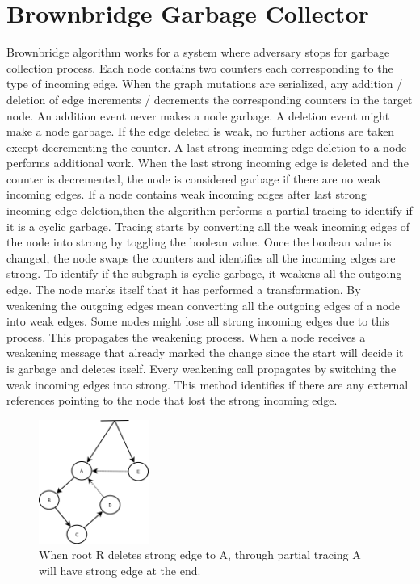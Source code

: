 \section{Brownbridge Garbage Collector}
Brownbridge algorithm works for a system where adversary stops for garbage collection process. Each node contains two counters each corresponding to the type of incoming edge. When the graph mutations are serialized, any addition / deletion of edge increments / decrements the corresponding counters in the target node. An addition event never makes a node garbage. A deletion event might make a node garbage. If the edge deleted is weak, no further actions are taken except decrementing the counter. A last strong incoming edge deletion to a node performs additional work. When the last strong incoming edge is deleted and the counter is decremented, the node is considered garbage if there are no weak incoming edges. If a node contains weak incoming edges after last strong incoming edge deletion,then the algorithm performs a partial tracing to identify if it is a cyclic garbage. Tracing starts by converting all the weak incoming edges of the node into strong by toggling the boolean value. Once the boolean value is changed, the node swaps the counters and identifies all the incoming edges are strong. To identify if the subgraph is cyclic garbage, it weakens all the outgoing edge. The node marks itself that it has performed a transformation. By weakening the outgoing edges mean converting all the outgoing edges of a node into weak edges. Some nodes might lose all strong incoming edges due to this process. This propagates the weakening process. When a node receives a weakening message that already marked the change since the start will decide it is garbage and deletes itself. Every weakening call propagates by switching the weak incoming edges into strong. This method identifies if there are any external references pointing to the node that lost the strong incoming edge. 

\begin{figure}[!t]
	\centering
	\includegraphics[width=0.32\textwidth]{figs/brownbridge}
	\caption{When root R deletes strong edge to A, through partial tracing A will have strong edge at the end.}
	\label{brownbridge}
\end{figure}

